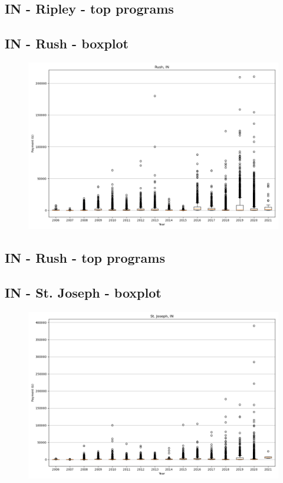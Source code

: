 \subsection*{IN - Ripley - top programs}

\newpage
\subsection*{IN - Rush - boxplot}
\begin{figure}[h]
\centering
\includegraphics[width=7in]{../output/boxplots/counties/Rush-IN_boxplot.png}
\end{figure}


\subsection*{IN - Rush - top programs}

\newpage
\subsection*{IN - St. Joseph - boxplot}
\begin{figure}[h]
\centering
\includegraphics[width=7in]{../output/boxplots/counties/St. Joseph-IN_boxplot.png}
\end{figure}


